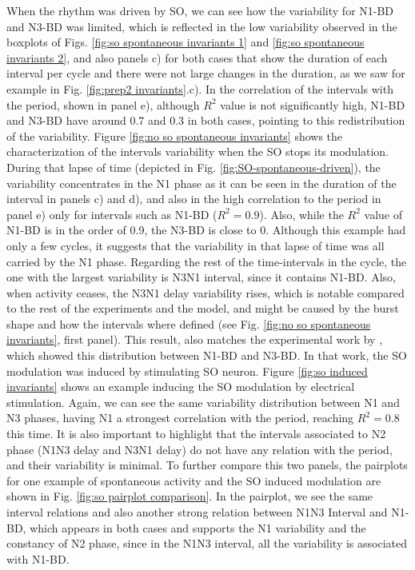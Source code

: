 When the rhythm was driven by SO, we can see how the variability for N1-BD and N3-BD was limited, which is  reflected in the low variability observed in the boxplots of Figs. \ref{fig:so spontaneous invariants 1} and \ref{fig:so spontaneous invariants 2}, and also panels c) for both cases that show the duration of each interval per cycle and there were not large changes in the duration, as we saw for example in Fig. \ref{fig:prep2 invariants}.c). In the correlation of the intervals with the period, shown in panel e), although $R^2$ value is not significantly high, N1-BD and N3-BD have around 0.7 and 0.3 in both cases, pointing to this redistribution of the variability. Figure \ref{fig:no so spontaneous invariants} shows the characterization of the intervals variability when the SO stops its modulation. During that lapse of time (depicted in Fig. \ref{fig:SO-spontaneous-driven}), the variability concentrates in the N1 phase as it can be seen in the duration of the interval in panels c) and d), and also in the high correlation to the period in panel e) only for intervals such as N1-BD ($R^2=0.9$). Also, while the $R^2$ value of N1-BD is in the order of 0.9, the N3-BD is close to 0. Although this example had only a few cycles, it suggests that the variability in that lapse of time was all carried by the N1 phase. Regarding the rest of the time-intervals in the cycle, the one with the largest variability is N3N1 interval, since it contains N1-BD. Also, when activity ceases, the N3N1 delay variability rises, which is notable compared to the rest of the experiments and the model, and might be caused by the burst shape and how the intervals where defined (see Fig. \ref{fig:no so spontaneous invariants}, first panel). This result, also matches the experimental work by \textcite{elliott_temporal_1991}, which showed this distribution between N1-BD and N3-BD. In that work, the SO modulation was induced by stimulating SO neuron. Figure \ref{fig:so induced invariants} shows an example inducing the SO modulation by electrical stimulation. Again, we can see the same variability distribution between N1 and N3 phases, having N1 a strongest correlation with the period, reaching $R^2=0.8$ this time. It is also important to highlight that the intervals associated to N2 phase (N1N3 delay and N3N1 delay) do not have any relation with the period, and their variability is minimal. To further compare this two panels, the pairplots for one example of spontaneous activity and the SO induced modulation are shown in Fig. \ref{fig:so pairplot comparison}. In the pairplot, we see the same interval relations and also another strong relation between N1N3 Interval and N1-BD, which appears in both cases and supports the N1 variability and the constancy of N2 phase, since in the N1N3 interval, all the variability is associated with N1-BD. 

